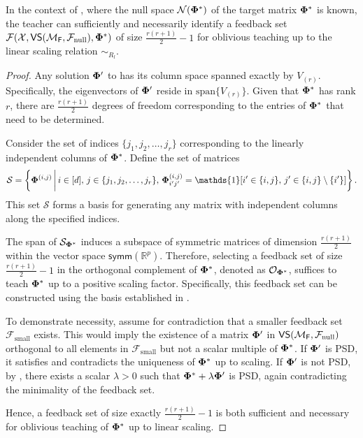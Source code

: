 \begin{lemma}\label{lem:orthoset}
    In the context of , where the null space $\mathcal{N}(\boldsymbol{\Phi}^*)$ of the target matrix $\boldsymbol{\Phi}^*$ is known, the teacher can sufficiently and necessarily identify a feedback set $\mathcal{F}(\mathcal{X}, \textsf{VS}({\mathcal{M}}_{\textsf{F}}, {\mathcal{F}}_{\text{null}}), \boldsymbol{\Phi}^*)$ of size $\frac{r(r+1)}{2} - 1$ for oblivious teaching up to the linear scaling relation $\sim_{R_l}$.
\end{lemma}
\begin{proof}
    Any solution $\boldsymbol{\Phi}'$ to  has its column space spanned exactly by $V_{(r)}$. Specifically, the eigenvectors of $\boldsymbol{\Phi}'$ reside in $\text{span}\{V_{(r)}\}$. Given that $\boldsymbol{\Phi}^*$ has rank $r$, there are $\frac{r(r+1)}{2}$ degrees of freedom corresponding to the entries of $\boldsymbol{\Phi}^*$ that need to be determined.

    Consider the set of indices $\{j_1, j_2, \ldots, j_r\}$ corresponding to the linearly independent columns of $\boldsymbol{\Phi}^*$. Define the set of matrices
    \[
        \mathcal{S} = \left\{\pphi^{(i,j)} \,\bigg|\, i \in [d], \, j \in \{j_1, j_2, \ldots, j_r\}, \, \pphi^{(i,j)}_{i'j'} = \mathds{1}[i' \in \{i,j\}, \, j' \in \{i,j\} \setminus \{i'\}]\right\}.
    \]
    This set $\mathcal{S}$ forms a basis for generating any matrix with independent columns along the specified indices.

    The span of $\mathcal{S}_{\boldsymbol{\Phi}^*}$ induces a subspace of symmetric matrices of dimension $\frac{r(r+1)}{2}$ within the vector space $\textsf{symm}(\mathbb{R}^p)$. Therefore, selecting a feedback set of size $\frac{r(r+1)}{2} - 1$ in the orthogonal complement of $\boldsymbol{\Phi}^*$, denoted as $\mathcal{O}_{\boldsymbol{\Phi}^*}$, suffices to teach $\boldsymbol{\Phi}^*$ up to a positive scaling factor. Specifically, this feedback set can be constructed using the basis established in .

    To demonstrate necessity, assume for contradiction that a smaller feedback set $\mathcal{F}_{\text{small}}$ exists. This would imply the existence of a matrix $\boldsymbol{\Phi}'$ in $\textsf{VS}({\mathcal{M}}_{\textsf{F}}, {\mathcal{F}}_{\text{null}})$ orthogonal to all elements in $\mathcal{F}_{\text{small}}$ but not a scalar multiple of $\boldsymbol{\Phi}^*$. If $\boldsymbol{\Phi}'$ is PSD, it satisfies  and contradicts the uniqueness of $\boldsymbol{\Phi}^*$ up to scaling. If $\boldsymbol{\Phi}'$ is not PSD, by , there exists a scalar $\lambda > 0$ such that $\boldsymbol{\Phi}^* + \lambda \boldsymbol{\Phi}'$ is PSD, again contradicting the minimality of the feedback set.

    Hence, a feedback set of size exactly $\frac{r(r+1)}{2} - 1$ is both sufficient and necessary for oblivious teaching of $\boldsymbol{\Phi}^*$ up to linear scaling.
\end{proof}

